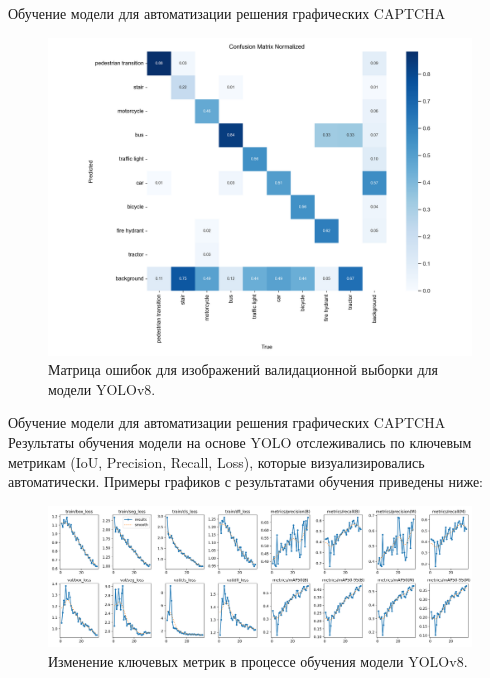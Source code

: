\documentclass[12pt,a4paper,mathserif]{beamer}
\begin{document}

\begin{frame}{\small Обучение модели для автоматизации решения графических CAPTCHA}
    \begin{figure}
        \centering
        \includegraphics[width=0.68\linewidth]{imgs/confusion_matrix_normalized.png}
        \caption{\centering Матрица ошибок для изображений валидационной выборки для модели YOLOv8.}
    \end{figure}
\end{frame}

\begin{frame}{\small Обучение модели для автоматизации решения графических CAPTCHA}
    \setlength{\parindent}{0.5cm}
    Результаты обучения модели на основе YOLO отслеживались по ключевым метрикам 
    (IoU, Precision, Recall, Loss), которые визуализировались автоматически. 
    Примеры графиков с результатами обучения приведены ниже:

    \begin{figure}[H]
        \centering
        \includegraphics[width=1\linewidth]{imgs/results.png}
        \caption{Изменение ключевых метрик в процессе обучения модели YOLOv8.}
    \end{figure}
\end{frame}
\end{document}
